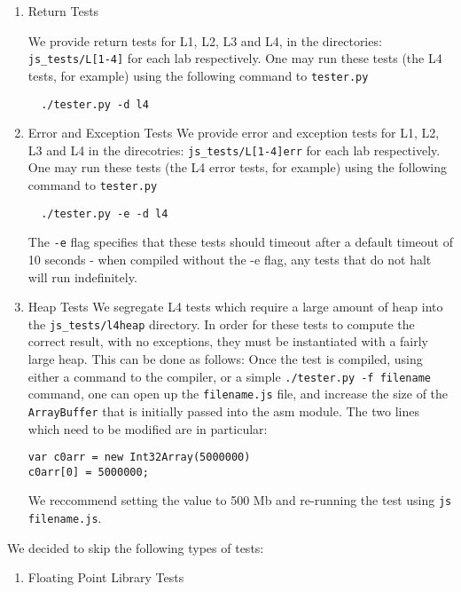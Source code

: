 \documentclass[twoside]{article}
\begin{document}
\begin{multicols}{2}
\begin{enumerate}

  \item Return Tests

  We provide return tests for L1, L2, L3 and L4, in the directories: 
  \texttt{js\_tests/L[1-4]} for each lab respectively. One may run these 
  tests (the L4 tests, for example) using the following command to \texttt{tester.py}
\begin{verbatim}
  ./tester.py -d l4
\end{verbatim}

  \item Error and Exception Tests
  We provide error and exception tests for L1, L2, L3 and L4 in the direcotries:
  \texttt{js\_tests/L[1-4]err} for each lab respectively. One may run these
  tests (the L4 error tests, for example) using the following command to \texttt{tester.py}
\begin{verbatim}
  ./tester.py -e -d l4
\end{verbatim}
  The \texttt{-e} flag specifies that these tests should timeout after a default
  timeout of 10 seconds - when compiled without the -e flag, any tests that do not
  halt will run indefinitely. 

  \item Heap Tests
  We segregate L4 tests which require a large amount of heap into the 
  \texttt{js\_tests/l4heap} directory. In order for these tests to compute
  the correct result, with no exceptions, they must be instantiated with a fairly
  large heap. This can be done as follows: Once the test is compiled, using either
  a command to the compiler, or a simple \texttt{./tester.py -f filename} command,
  one can open up the \texttt{filename.js} file, and increase the size of the 
  \texttt{ArrayBuffer} that is initially passed into the asm module. The two lines
  which need to be modified are in particular: 
\begin{verbatim}
var c0arr = new Int32Array(5000000)
c0arr[0] = 5000000;
\end{verbatim}
  We reccommend setting the value to 500 Mb and re-running the test using 
  \texttt{js filename.js}. 
\end{enumerate}

We decided to skip the following types of tests:

\begin{enumerate}

  \item Floating Point Library Tests


\end{enumerate}
\end{multicols}
\end{document}
